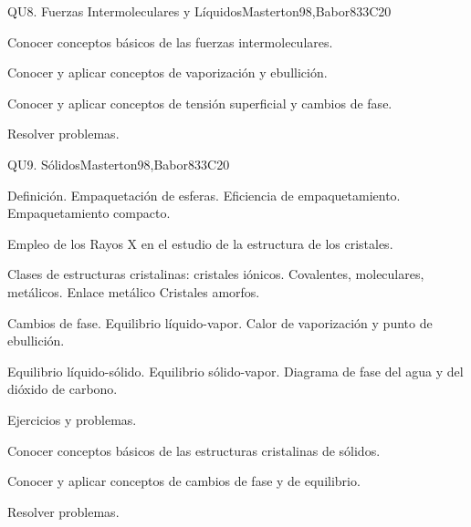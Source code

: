 \begin{syllabus}
\begin{unit}{QU8. Fuerzas Intermoleculares y Líquidos}{}{Masterton98,Babor83}{3}{C20}
   \begin{learningoutcomes}
      \item Conocer conceptos básicos de las fuerzas intermoleculares.
      \item Conocer y aplicar conceptos de vaporización y ebullición.
      \item Conocer y aplicar conceptos de tensión superficial y cambios de fase.
      \item Resolver problemas.
   \end{learningoutcomes}
\end{unit}

\begin{unit}{QU9. Sólidos}{}{Masterton98,Babor83}{3}{C20}
\begin{topics}
      \item Definición. Empaquetación de esferas. Eficiencia de empaquetamiento. Empaquetamiento compacto.
      \item Empleo de los Rayos X en el estudio de la estructura de los cristales.
      \item Clases de estructuras cristalinas: cristales iónicos. Covalentes, moleculares, metálicos. Enlace metálico Cristales amorfos.
      \item Cambios de fase. Equilibrio líquido-vapor. Calor de vaporización y punto de ebullición.
      \item Equilibrio líquido-sólido. Equilibrio sólido-vapor. Diagrama de fase  del agua y del dióxido de carbono.
      \item Ejercicios y problemas.
    \end{topics}

   \begin{learningoutcomes}
      \item Conocer conceptos básicos de las estructuras cristalinas de sólidos.
      \item Conocer y aplicar conceptos de cambios de fase y de equilibrio.
      \item Resolver problemas.
   \end{learningoutcomes}
\end{unit}


\end{syllabus}
